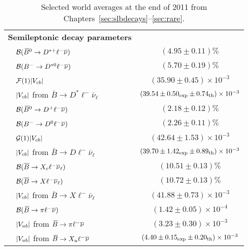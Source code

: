 \begin{table}
\caption{Selected world averages at the end of 2011
from Chapters~\ref{sec:slbdecays}--\ref{sec:rare}.}
\label{tab_summary2}
\renewcommand{\arraystretch}{1.15}
\begin{center}
\begin{tabular}{|l|c|}
\hline
{\bf\boldmath Semileptonic \B decay parameters} & \\
 ~~${\cal B}(\kern 0.18em\overline{\kern -0.18em B}{}^0\to D^{*+}\ell^-\overline{\nu})$ & $(4.95\pm 0.11)\%$\\
 ~~${\cal B}(B^-\to D^{*0}\ell^-\overline{\nu})$ & $(5.70\pm 0.19)\%$\\
 ~~${\cal F}(1)|V_{cb}|$ & $(35.90\pm 0.45)\times 10^{-3}$\\
 ~~$|V_{cb}|$ from $\bar B\to D^*\ell^-\bar\nu_\ell$ & $(39.54\pm
 0.50_{\rm exp}\pm 0.74_{\rm th})\times 10^{-3}$\\
\hline
 ~~${\cal B}(\kern 0.18em\overline{\kern -0.18em B}{}^0\to D^+\ell^-\overline{\nu})$ & $(2.18\pm 0.12)\%$\\
 ~~${\cal B}(B^-\to D^0\ell^-\overline{\nu})$ & $(2.26\pm 0.11)\%$\\
 ~~${\cal G}(1)|V_{cb}|$ & $(42.64 \pm 1.53)\times 10^{-3}$\\
 ~~$|V_{cb}|$ from $\bar B\to D\ell^-\bar\nu_\ell$ & $(39.70\pm 1.42_{\rm
 exp}\pm 0.89_{\rm th})\times 10^{-3}$\\
\hline
 ~~${\cal B}(\bar B\to X_c\ell^-\bar\nu_\ell)$ & $(10.51\pm 0.13)\%$\\
 ~~${\cal B}(\bar B\to X\ell^-\bar\nu_\ell)$ & $(10.72\pm 0.13)\%$\\
 ~~$|V_{cb}|$ from $\bar B\to X\ell^-\bar\nu_\ell$ & $(41.88\pm
 0.73)\times 10^{-3}$\\
\hline
 ~~${\cal B}(\kern 0.18em\overline{\kern -0.18em B}{}\to\pi\ell^-\overline{\nu})$ & $(1.42\pm 0.05)\times 10^{-4}$\\
 ~~$|V_{ub}|$ from $\kern 0.18em\overline{\kern -0.18em B}{}\to\pi\ell^-\overline{\nu}$ & $(3.23\pm 0.30)\times
 10^{-3}$\\
 ~~$|V_{ub}|$ from $\kern 0.18em\overline{\kern -0.18em B}{}\to X_u\ell^-\overline{\nu}$ & $(4.40\pm 0.15_{\rm exp}\pm
 0.20_{\rm th})\times 10^{-3}$\\
\hline
\hline
\end{tabular}
\end{center}
\end{table}
